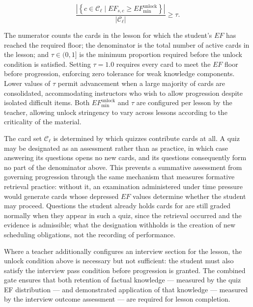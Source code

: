 \begin{equation}
\frac{
    \left|\left\{
        c \in \mathcal{C}_{\ell} \mid 
        EF_{s,c} \geq EF_{\min}^{\text{unlock}}
    \right\}\right|
}{
    \left|\mathcal{C}_{\ell}\right|
} \geq \tau.
\end{equation}

The numerator counts the cards in the lesson for which the student's $EF$ has reached the required floor; the denominator is the total number of active cards in the lesson; and $\tau \in (0, 1]$ is the minimum proportion required before the unlock condition is satisfied. Setting $\tau = 1.0$ requires every card to meet the $EF$ floor before progression, enforcing zero tolerance for weak knowledge components. Lower values of $\tau$ permit advancement when a large majority of cards are consolidated, accommodating instructors who wish to allow progression despite isolated difficult items. Both $EF_{\min}^{\text{unlock}}$ and $\tau$ are configured per lesson by the teacher, allowing unlock stringency to vary across lessons according to the criticality of the material.

The card set $\mathcal{C}_{\ell}$ is determined by which quizzes contribute cards at all. A quiz may be designated as an assessment rather than as practice, in which case answering its questions opens no new cards, and its questions consequently form no part of the denominator above. This prevents a summative assessment from governing progression through the same mechanism that measures formative retrieval practice: without it, an examination administered under time pressure would generate cards whose depressed $EF$ values determine whether the student may proceed. Questions the student already holds cards for are still graded normally when they appear in such a quiz, since the retrieval occurred and the evidence is admissible; what the designation withholds is the creation of new scheduling obligations, not the recording of performance.

Where a teacher additionally configures an interview section for the lesson, the unlock condition above is necessary but not sufficient: the student must also satisfy the interview pass condition before progression is granted. The combined gate ensures that both retention of factual knowledge — measured by the quiz EF distribution — and demonstrated application of that knowledge — measured by the interview outcome assessment — are required for lesson completion.

